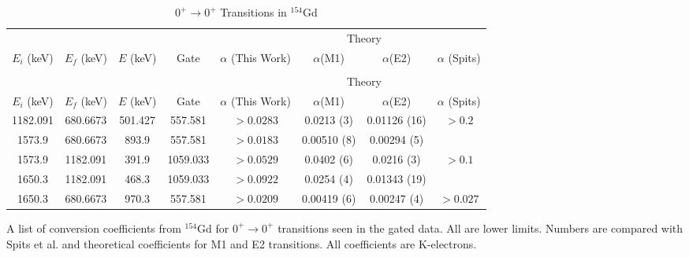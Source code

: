 \begin{sidewaystable}
    \begin{longtable}{c|c|c|c|c|c|c|c}
        \caption{$0^+\rightarrow 0^+$ Transitions in $^{154}$Gd}
        \label{tab:154Gd_0_to_0}\\
        \toprule
        &	& 	&  &	& \multicolumn{2}{c|}{Theory}	& 	\\ 
        $E_i$ (keV)	&	$E_f$ (keV)	& $E$ (keV)	&	Gate &		$\alpha$ (This Work)	& $\alpha$(M1) & $\alpha$(E2) &	$\alpha$ (Spits)	\\
        \hline
        \endfirsthead
        \toprule
        \caption[]{$0^+\rightarrow 0^+$ Transitions in $^{154}$Gd}\\
        &	& 	&  &	& \multicolumn{2}{c|}{Theory}	& 	\\ 
        $E_i$ (keV)	&	$E_f$ (keV)	& $E$ (keV)	&	Gate &		$\alpha$ (This Work)	& $\alpha$(M1) & $\alpha$(E2) &	$\alpha$ (Spits)	\\
        \hline
	    \endhead
	    1182.091 & 680.6673 &  501.427 & 557.581 & $>0.0283$ & 0.0213 (3) & 0.01126 (16) & $>0.2$ \\\hline
        1573.9 & 680.6673 &  893.9 & 557.581 & $>0.0183$ & 0.00510 (8) & 0.00294 (5) & \\\hline
        1573.9 & 1182.091 &  391.9 &  1059.033 & $>0.0529$ & 0.0402 (6) & 0.0216 (3) & $>0.1$ \\\hline
        1650.3 & 1182.091 &  468.3 &  1059.033 & $>0.0922$ & 0.0254 (4) & 0.01343 (19) & \\\hline
        1650.3 & 680.6673 &  970.3 & 557.581 & $>0.0209$ & 0.00419 (6) & 0.00247 (4) & $>0.027$ \\
        \bottomrule
	\end{longtable}
    \item{A list of conversion coefficients from $^{154}$Gd for $0^+\rightarrow 0^+$ transitions seen in the gated data. All are lower limits. Numbers are compared with Spits et al.\citep{spits96:_154gd} and theoretical coefficients for M1 and E2 transitions. All coefficients are K-electrons.}
\end{sidewaystable}